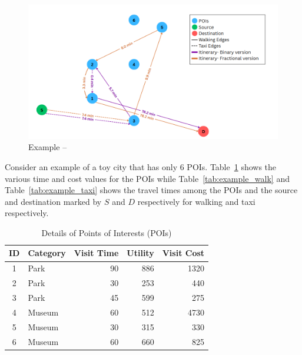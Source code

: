 \begin{figure}[t]
	\centering
	\includegraphics[width=\columnwidth]{toy.png}
	\caption{Example -- }
	\label{fig:example_graph}
\end{figure}

Consider an example of a toy city that has only 6 POIs.
Table~\ref{tab:example_poi} shows the various time and cost values for
the POIs while Table~\ref{tab:example_walk} and
Table~\ref{tab:example_taxi} shows the travel times among the POIs and
the source and destination marked by $S$ and $D$ respectively for
walking and taxi respectively.

\begin{table}[t]
	\centering
	\resizebox{0.85\columnwidth}{!}
	{
		\begin{tabular}{c l rrr}
			\toprule
			\textbf{ID} & \textbf{Category} & \textbf{Visit Time} & \textbf{Utility} & \textbf{Visit Cost} \\
			\midrule
			1 & Park        & 90 & 886 & 1320 \\
			2 & Park        & 30 & 253 & 440  \\
			3 & Park        & 45 & 599 & 275  \\
			4 & Museum      & 60 & 512 & 4730 \\
			5 & Museum      & 30 & 315 & 330  \\
			6 & Museum      & 60 & 660 & 825  \\
			\bottomrule
		\end{tabular}
	}
	\caption{Details of Points of Interests (POIs)}
	\label{tab:example_poi}
\end{table}

